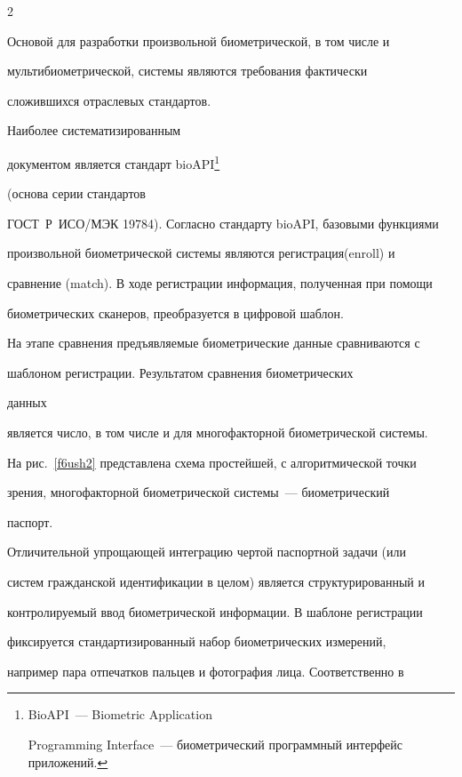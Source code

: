 \begin{multicols}{2}
 

Основой для разработки произвольной био\-мет\-ри\-че\-ской, в том числе и 

муль\-ти\-био\-мет\-ри\-че\-ской, системы являются требования фактически 

сложившихся отраслевых стандартов.\linebreak

 Наиболее систематизированным 

документом является стандарт bioAPI\footnote{BioAPI~--- Biometric Application

Programming Interface~--- биометрический программный интерфейс приложений.} 

(основа серии стандартов 

ГОСТ~Р~ИСО/МЭК 19784). Согласно стандарту bioAPI, базовыми функциями 

произвольной биометрической системы являются регистрация\linebreak (enroll) и 

сравнение (match). В ходе регистрации  информация, полученная  при помощи 

биометрических сканеров, преобразуется в циф\-ро\-вой шаб\-лон.





  

  На этапе сравнения предъявляемые биометрические данные сравниваются с 

шаблоном регистрации. Результатом сравнения биометрических %

 данных 

является число, в том числе и для многофакторной биометрической системы. 

На рис.~\ref{f6ush2} пред\-став\-ле\-на схема простейшей, с алгоритмической точки 

зрения, многофакторной  биометрической системы~--- биометрический 

паспорт. 

  

  Отличительной упрощающей интеграцию чертой паспортной задачи (или 

систем гражданской идентификации в целом) является структурированный и 

контролируемый ввод биометрической информации. В шаблоне регистрации 

фиксируется стандартизированный набор биометрических измерений, 

например пара отпечатков пальцев и фотография лица. Соответственно в 


\end{multicols}
